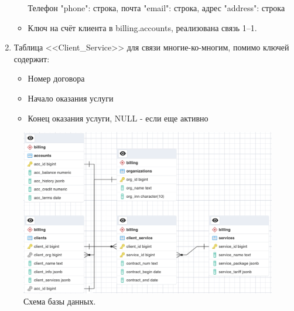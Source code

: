 \documentclass[oneside,senior,etd]{BYUPhysForDegree}
\begin{document}
\begin{enumerate}
\begin{itemize}
        Телефон "phone": строка, почта "email": строка, адрес "address": строка
        \item Ключ на счёт клиента в billing.accounts, реализована связь 1--1.
    \end{itemize}
    \item Таблица <<Client\_Service>> для связи многие-ко-многим, помимо ключей содержит: \begin{itemize}
        \item Номер договора
        \item Начало оказания услуги
        \item Конец оказания услуги, NULL - если еще активно
    \end{itemize}

\end{enumerate}
\begin{figure}[hbt!]
    \centering
    \includegraphics[width=1.0\linewidth]{scheme.png}
    \caption{Схема базы данных.}
    \label{fig:scheme}
\end{figure}
\end{document}
